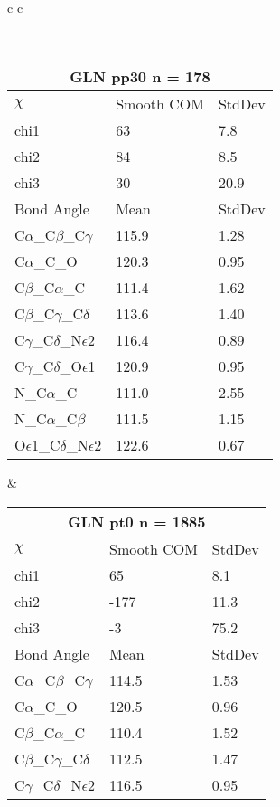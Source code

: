 \newpage

\begin{longtable}{ c c }

\caption{GLN Central Values}\\
  \begin{tabular}{ l l l }
  \toprule
  \multicolumn{3}{c}{GLN \textbf{pp30} n = 178} \\ \toprule
  $\chi$       & Smooth COM & StdDev \\ \midrule
  chi1 & 63 & 7.8 \\ 
  chi2 & 84 & 8.5 \\ 
  chi3 & 30 & 20.9 \\ \midrule
  Bond Angle   & Mean     & StdDev \\ \midrule
  C$\alpha$\_C$\beta$\_C$\gamma$ & 115.9 & 1.28\\
  C$\alpha$\_C\_O & 120.3 & 0.95\\
  C$\beta$\_C$\alpha$\_C & 111.4 & 1.62\\
  C$\beta$\_C$\gamma$\_C$\delta$ & 113.6 & 1.40\\
  C$\gamma$\_C$\delta$\_N$\epsilon$2 & 116.4 & 0.89\\
  C$\gamma$\_C$\delta$\_O$\epsilon$1 & 120.9 & 0.95\\
  N\_C$\alpha$\_C & 111.0 & 2.55\\
  N\_C$\alpha$\_C$\beta$ & 111.5 & 1.15\\
  O$\epsilon$1\_C$\delta$\_N$\epsilon$2 & 122.6 & 0.67\\
  \bottomrule
  \end{tabular}
  &
  \begin{tabular}{ l l l }
  \toprule
  \multicolumn{3}{c}{GLN \textbf{pt0} n = 1885} \\ \toprule
  $\chi$       & Smooth COM & StdDev \\ \midrule
  chi1 & 65 & 8.1 \\ 
  chi2 & -177 & 11.3 \\ 
  chi3 & -3 & 75.2 \\ \midrule
  Bond Angle   & Mean     & StdDev \\ \midrule
  C$\alpha$\_C$\beta$\_C$\gamma$ & 114.5 & 1.53\\
  C$\alpha$\_C\_O & 120.5 & 0.96\\
  C$\beta$\_C$\alpha$\_C & 110.4 & 1.52\\
  C$\beta$\_C$\gamma$\_C$\delta$ & 112.5 & 1.47\\
  C$\gamma$\_C$\delta$\_N$\epsilon$2 & 116.5 & 0.95\\

\end{tabular}
\end{longtable}
